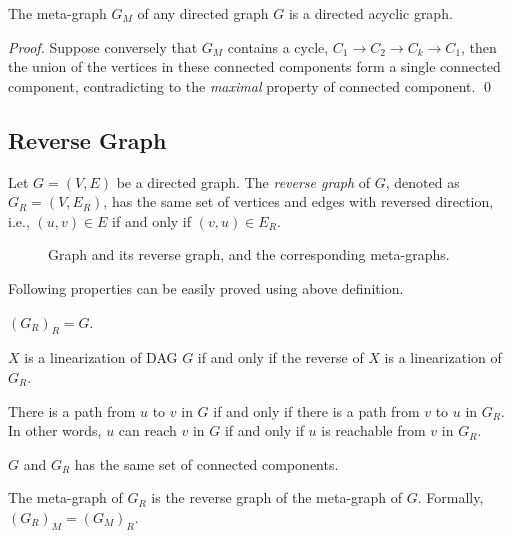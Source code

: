\begin{claim}
The meta-graph $G_M$ of any directed graph $G$ is a directed acyclic graph.
\end{claim}

\emph{Proof.} Suppose conversely that $G_M$ contains a cycle, $C_1 \to C_2 \to C_k \to C_1$,
then the union of the vertices in these connected components form a single connected component,
contradicting to the \emph{maximal} property of connected component. \qed

\subsection*{Reverse Graph}

\begin{definition}
Let $G = (V,E)$ be a directed graph. The \emph{reverse graph} of $G$, denoted as $G_R = (V, E_R)$,
has the same set of vertices and edges with reversed direction, i.e., $(u,v) \in E$ if and only if $(v,u)\in E_R$.
\end{definition}

\begin{figure}[!h]
\centering{}
\caption{Graph and its reverse graph, and the corresponding meta-graphs.}
\label{fig:reverse}
\end{figure}

Following properties can be easily proved using above definition.

\begin{property}
$(G_R)_R = G$.
\end{property}

\begin{property}
$X$ is a linearization of DAG $G$ if and only if the reverse of $X$ is a linearization of $G_R$. %
\end{property}

\begin{property}
There is a path from $u$ to $v$ in $G$ if and only if there is a path from $v$ to $u$ in $G_R$.
In other words, $u$ can reach $v$ in $G$ if and only if $u$ is reachable from $v$ in $G_R$.
\end{property}


\begin{property}
$G$ and $G_R$ has the same set of connected components. %
\end{property}

\begin{property}
The meta-graph of $G_R$ is the reverse graph of the meta-graph of $G$. Formally, $(G_R)_M = (G_M)_R$.
\end{property}

